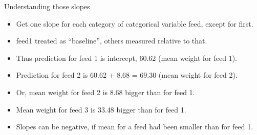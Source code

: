 \documentclass[
  ignorenonframetext,
]{beamer}
\providecommand{\tightlist}{%
  \setlength{\itemsep}{0pt}\setlength{\parskip}{0pt}}
\begin{document}
\begin{frame}{Understanding those slopes}
\protect\hypertarget{understanding-those-slopes}{}

\begin{itemize}
\tightlist
\item
  Get one slope for each category of categorical variable feed, except
  for first.
\item
  feed1 treated as ``baseline'', others measured relative to that.
\item
  Thus prediction for feed 1 is intercept, 60.62 (mean weight for feed
  1).
\item
  Prediction for feed 2 is 60.62 + 8.68 = 69.30 (mean weight for feed
  2).
\item
  Or, mean weight for feed 2 is 8.68 bigger than for feed 1.
\item
  Mean weight for feed 3 is 33.48 bigger than for feed 1.
\item
  Slopes can be negative, if mean for a feed had been smaller than for
  feed 1.
\end{itemize}

\end{frame}
\end{document}

